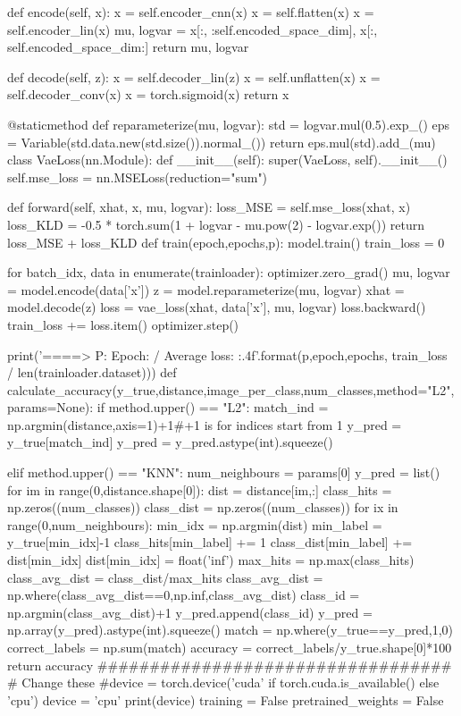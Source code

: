 \documentclass{article}
\begin{document}
\begin{python}
	def encode(self, x):
		x = self.encoder_cnn(x)
		x = self.flatten(x)
		x = self.encoder_lin(x)
		mu, logvar = x[:, :self.encoded_space_dim], x[:, self.encoded_space_dim:]
		return mu, logvar

	def decode(self, z):
		x = self.decoder_lin(z)
		x = self.unflatten(x)
		x = self.decoder_conv(x)
		x = torch.sigmoid(x)
		return x

	@staticmethod
	def reparameterize(mu, logvar):
		std = logvar.mul(0.5).exp_()
		eps = Variable(std.data.new(std.size()).normal_())
		return eps.mul(std).add_(mu)
class VaeLoss(nn.Module):
	def __init__(self):
		super(VaeLoss, self).__init__()
		self.mse_loss = nn.MSELoss(reduction="sum")

	def forward(self, xhat, x, mu, logvar):
		loss_MSE = self.mse_loss(xhat, x)
		loss_KLD = -0.5 * torch.sum(1 + logvar - mu.pow(2) - logvar.exp())
		return loss_MSE + loss_KLD
def train(epoch,epochs,p):
	model.train()
	train_loss = 0

	for batch_idx, data in enumerate(trainloader):
		optimizer.zero_grad()
		mu, logvar = model.encode(data['x'])
		z = model.reparameterize(mu, logvar)
		xhat = model.decode(z)
		loss = vae_loss(xhat, data['x'], mu, logvar)
		loss.backward()
		train_loss += loss.item()
		optimizer.step()

	print('====> P: {} Epoch: {}/{} Average loss: {:.4f}'.format(p,epoch,epochs, train_loss / len(trainloader.dataset)))
def calculate_accuracy(y_true,distance,image_per_class,num_classes,method="L2",params=None):
	if method.upper() == "L2":
		match_ind = np.argmin(distance,axis=1)+1#+1 is for indices start from 1
		y_pred = y_true[match_ind]
		y_pred = y_pred.astype(int).squeeze()

	elif method.upper() == "KNN":
		num_neighbours = params[0]
		y_pred = list()
		for im in range(0,distance.shape[0]):
			dist = distance[im,:]
			class_hits = np.zeros((num_classes))
			class_dist = np.zeros((num_classes))
			for ix in range(0,num_neighbours):
				min_idx = np.argmin(dist)
				min_label = y_true[min_idx]-1
				class_hits[min_label] += 1
				class_dist[min_label] += dist[min_idx]
				dist[min_idx] = float('inf')
			max_hits = np.max(class_hits)
			class_avg_dist = class_dist/max_hits
			class_avg_dist = np.where(class_avg_dist==0,np.inf,class_avg_dist)
			class_id = np.argmin(class_avg_dist)+1
			y_pred.append(class_id)
		y_pred = np.array(y_pred).astype(int).squeeze()
	match = np.where(y_true==y_pred,1,0)
	correct_labels = np.sum(match)
	accuracy = correct_labels/y_true.shape[0]*100
	return accuracy
##################################
# Change these
#device = torch.device('cuda' if torch.cuda.is_available() else 'cpu')
device = 'cpu'
print(device)
training = False
pretrained_weights = False



\end{python}
\end{document}
